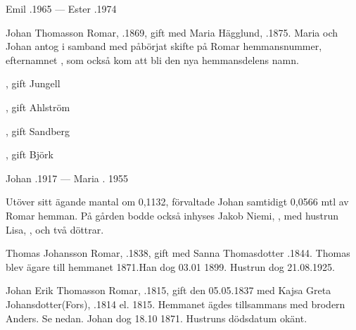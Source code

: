 Emil .1965  ---  Ester .1974


Johan Thomasson Romar, .1869, gift med Maria Hägglund, .1875. Maria och Johan antog i samband med påbörjat skifte på Romar hemmansnummer, efternamnet , som också kom att bli den nya hemmansdelens namn.
\begin{jhchildren}
  \item {}
  \item {}, gift Jungell
  \item {}, gift Ahlström
  \item {}, gift Sandberg
  \item {}
  \item {}, gift Björk
\end{jhchildren}

Johan .1917  ---  Maria . 1955

Utöver sitt ägande mantal om 0,1132, förvaltade Johan samtidigt 0,0566 mtl av Romar hemman. På gården bodde också inhyses Jakob Niemi, , med hustrun Lisa, , och två döttrar.


Thomas Johansson Romar, .1838, gift med Sanna Thomasdotter .1844.
Thomas blev ägare till hemmanet 1871.Han dog 03.01 1899. Hustrun dog 21.08.1925.
\begin{jhchildren}
  \item {}
  \item {}
  \item {}
  \item {}
  \item {}
  \item {}
  \item {}
  \item {}
\end{jhchildren}


Johan Erik Thomasson Romar, .1815, gift den 05.05.1837 med Kajsa Greta Johansdotter(Fors), .1814 el. 1815.
Hemmanet ägdes tillsammans med brodern Anders. Se nedan. Johan dog 18.10 1871. Hustruns dödsdatum okänt.
\begin{jhchildren}
  \item {}
  \item {}
  \item {}
  \item {}
\end{jhchildren}



